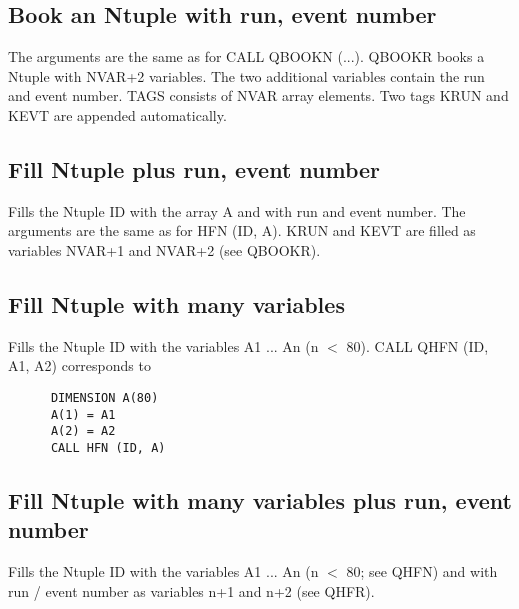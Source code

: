 \subsection{\label{sec-QBR}Book an Ntuple with run, event number}
\par
{}
\par
\par The arguments are the same as for CALL QBOOKN (...).
QBOOKR books a Ntuple with NVAR+2 variables. The two additional variables
contain the run and event number.
TAGS consists of NVAR array elements. Two tags KRUN and KEVT are
appended automatically.
 
\subsection{\label{sec-QBFR}Fill Ntuple plus run, event number}
\par
\par
{}
\par Fills the Ntuple ID with the array A and with run and event number.
The arguments are the same as for HFN (ID, A).
KRUN and KEVT are filled as variables NVAR+1 and NVAR+2 (see QBOOKR).
 
\subsection{\label{sec-QBFN}Fill Ntuple with many variables}
\par
{}
\par
\par Fills the Ntuple ID with the variables A1 ... An (n $<$ 80).
CALL QHFN (ID, A1, A2) corresponds to
\begin{verbatim}
      DIMENSION A(80)
      A(1) = A1
      A(2) = A2
      CALL HFN (ID, A)
\end{verbatim}
 
\subsection{\label{sec-QBFRN}Fill Ntuple with many variables plus
run, event number}
\par
{}
\par
\par Fills the Ntuple ID with the variables A1 ... An (n $<$ 80; see
QHFN) and with
run / event number as variables n+1 and n+2 (see QHFR).
\par
\newpage
